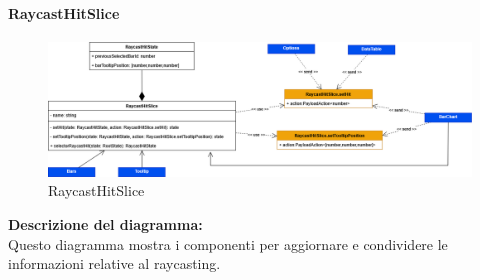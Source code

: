 \paragraph{RaycastHitSlice}
\begin{figure}[h!] \centering
      \includegraphics[scale=0.4]{template/images/uml_front/logic/raycastslice.png}
      \caption{RaycastHitSlice}
\end{figure}
\textbf{Descrizione del diagramma:}\\
Questo diagramma mostra i componenti per aggiornare e condividere le informazioni relative al raycasting.
